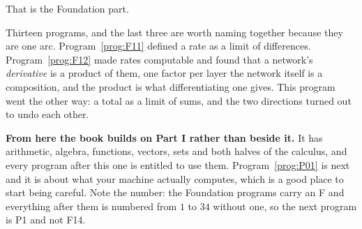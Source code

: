 \begin{fr}
That is the Foundation part.

Thirteen programs, and the last three are worth naming together because they
are one arc. Program~\ref{prog:F11} defined a rate as a limit of differences.
Program~\ref{prog:F12} made rates computable and found that a network's
\emph{derivative} is a product of them, one factor per layer \dash{} the
network itself is a composition, and the product is what differentiating one
gives. This program went the other way: a total as a limit of sums,
and the two directions turned out to undo each other.

\textbf{From here the book builds on Part I rather than beside it.} It has
arithmetic, algebra, functions, vectors, sets and both halves of the calculus,
and every program after this one is entitled to use them.
Program~\ref{prog:P01} is next and it is about what your machine actually
computes, which is a good place to start being careful. Note the number: the
Foundation programs carry an F and everything after them is numbered from $1$
to $34$ without one, so the next program is P1 and not F14.
\end{fr}

